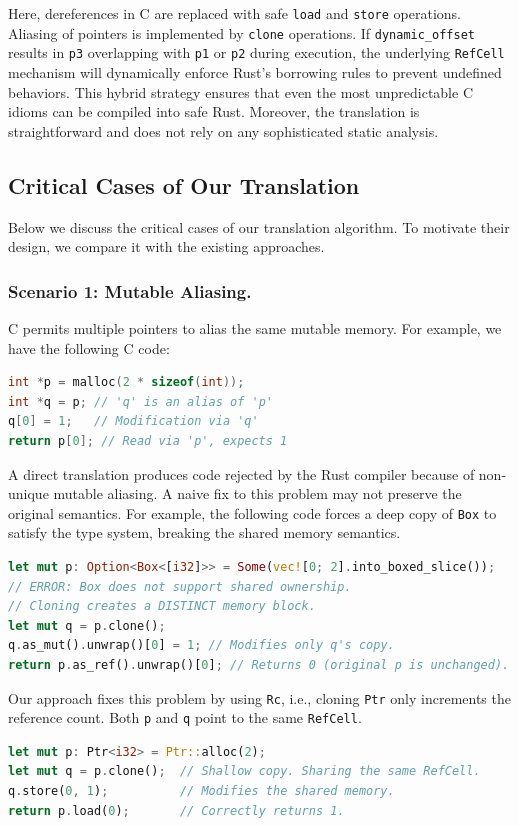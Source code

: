 \documentclass{llncs} %
\begin{document}
Here, dereferences in C are replaced with safe \texttt{load} and \texttt{store} operations. Aliasing of pointers is implemented by \texttt{clone} operations. If \texttt{dynamic\_offset} results in \texttt{p3} overlapping with \texttt{p1} or \texttt{p2} during execution, the underlying \texttt{RefCell} mechanism will dynamically enforce Rust's borrowing rules to prevent undefined behaviors. This hybrid strategy ensures that even the most unpredictable C idioms can be compiled into safe Rust. Moreover, the translation is straightforward and does not rely on any sophisticated static analysis.

\subsection{Critical Cases of Our Translation}

Below we discuss the critical cases of our translation algorithm. To motivate their design, we compare it with the existing approaches.

\vspace{-0.3cm}
\subsubsection{Scenario 1: Mutable Aliasing.}
C permits multiple pointers to alias the same mutable memory. For example, we have the following C code:
%
\begin{lstlisting}[language=C]
int *p = malloc(2 * sizeof(int));
int *q = p; // 'q' is an alias of 'p'
q[0] = 1;   // Modification via 'q'
return p[0]; // Read via 'p', expects 1
\end{lstlisting}
%

A direct translation produces code rejected by the Rust compiler because of non-unique mutable aliasing. A naive fix to this problem may not preserve the original semantics. For example, the following code forces a deep copy of \texttt{Box} to satisfy the type system, breaking the shared memory semantics.
\begin{lstlisting}[language=Rust]
let mut p: Option<Box<[i32]>> = Some(vec![0; 2].into_boxed_slice());
// ERROR: Box does not support shared ownership. 
// Cloning creates a DISTINCT memory block.
let mut q = p.clone(); 
q.as_mut().unwrap()[0] = 1; // Modifies only q's copy.
return p.as_ref().unwrap()[0]; // Returns 0 (original p is unchanged).
\end{lstlisting}

Our approach fixes this problem by using \texttt{Rc}, i.e., cloning \texttt{Ptr} only increments the reference count. Both \texttt{p} and \texttt{q} point to the same \texttt{RefCell}.
\begin{lstlisting}[language=Rust]
let mut p: Ptr<i32> = Ptr::alloc(2);
let mut q = p.clone();  // Shallow copy. Sharing the same RefCell.
q.store(0, 1);          // Modifies the shared memory.
return p.load(0);       // Correctly returns 1.
\end{lstlisting}
\end{document}
